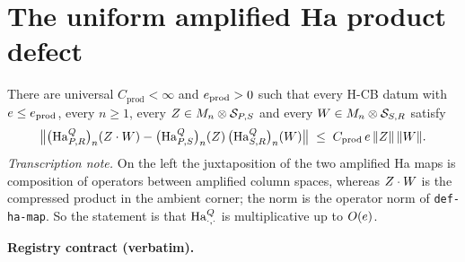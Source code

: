 \section{The uniform amplified Ha product defect}\label{sec:hcb2-product-defect}

\begin{lemma}\label{lem:hcb2-product-defect}
There are universal $C_{\mathrm{prod}}<\infty$ and $e_{\mathrm{prod}}>0$ such that
every H-CB datum with $e\le e_{\mathrm{prod}}$, every $n\ge1$, every
$Z\in M_{n}\otimes \mathcal S_{P,S}$ and every $W\in M_{n}\otimes \mathcal S_{S,R}$ satisfy
\begin{equation}\label{eq:pd-main}
  \bigl\lVert\bigl(\mathrm{Ha}^{Q}_{P,R}\bigr)_{n}(Z\mathbin{\cdot} W)-\bigl(\mathrm{Ha}^{Q}_{P,S}\bigr)_{n}(Z)\,\bigl(\mathrm{Ha}^{Q}_{S,R}\bigr)_{n}(W)\bigr\rVert
  \;\le\;C_{\mathrm{prod}}\,e\,\lVert Z\rVert\,\lVert W\rVert.
\end{equation}
\emph{Transcription note.} On the left the juxtaposition of the two amplified Ha maps is
composition of operators between amplified column spaces, whereas $Z\mathbin{\cdot} W$ is the
compressed product in the ambient corner; the norm is the operator norm of
\texttt{def-ha-map}. So the statement is that $\mathrm{Ha}^{Q}_{\cdot,\cdot}$ is multiplicative up
to $O(e)$.
\end{lemma}

\noindent\textbf{Registry contract (verbatim).}

